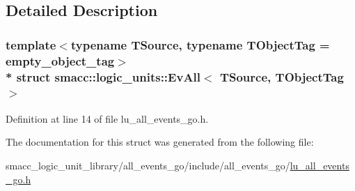 \subsection{Detailed Description}
\subsubsection*{template$<$typename T\+Source, typename T\+Object\+Tag = empty\+\_\+object\+\_\+tag$>$\\*
struct smacc\+::logic\+\_\+units\+::\+Ev\+All$<$ T\+Source, T\+Object\+Tag $>$}



Definition at line 14 of file lu\+\_\+all\+\_\+events\+\_\+go.\+h.



The documentation for this struct was generated from the following file\+:\begin{DoxyCompactItemize}
\item 
smacc\+\_\+logic\+\_\+unit\+\_\+library/all\+\_\+events\+\_\+go/include/all\+\_\+events\+\_\+go/\hyperlink{lu__all__events__go_8h}{lu\+\_\+all\+\_\+events\+\_\+go.\+h}\end{DoxyCompactItemize}
